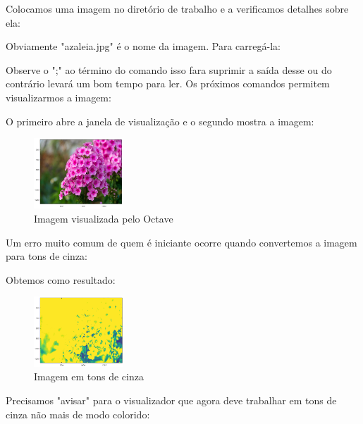 \documentclass[a4paper,11pt]{article}
\begin{document}
Colocamos uma imagem no diretório de trabalho e a verificamos detalhes sobre ela: \\

Obviamente "azaleia.jpg" é o nome da imagem. Para carregá-la: \\

Observe o ";" ao término do comando isso fara suprimir a saída desse ou do contrário levará um bom tempo para ler. Os próximos comandos permitem visualizarmos a imagem: \\

O primeiro abre a janela de visualização e o segundo mostra a imagem:
\begin{figure}[H]
	\centering
	\includegraphics[width=0.3\textwidth]{imagem/azaleia}
	\caption{Imagem visualizada pelo Octave}
\end{figure}

Um erro muito comum de quem é iniciante ocorre quando convertemos a imagem para tons de cinza: \\

Obtemos como resultado:
\begin{figure}[H]
	\centering
	\includegraphics[width=0.3\textwidth]{imagem/azaleiag1}
	\caption{Imagem em tons de cinza}
\end{figure}

Precisamos "avisar" para o visualizador que agora deve trabalhar em tons de cinza não mais de modo colorido: \\
\end{document}
